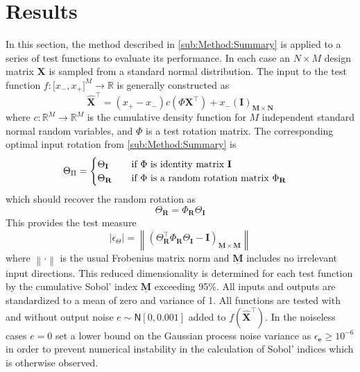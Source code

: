\documentclass[preprint,12pt]{elsarticle}
\newcommand*{\M}[1]{\ensuremath{#1}\xspace}
\newcommand*{\vr}[1]{\M{\mathbf{#1}}}
\newcommand*{\st}[1]{\M{\mathbb{#1}}}
\newcommand{\T}[1]{\text{#1}}
\newcommand*{\QT}[2][]{\M{\quad\T{#2}\ifthenelse{\equal{#1}{}}{\quad}{#1}}}
\newcommand*{\gauss}[2]{\mathsf{N}\!\left\lbrack{} #1 , #2 \right\rbrack}
\newcommand*{\modulus}[1]{\M{\left\lvert#1\right\rvert}}
\newcommand*{\norm}[1]{\M{\left\lVert#1\right\rVert}}
\begin{document}
    \section{Results} \label{sec:Results}
        In this section, the method described in \cref{sub:Method:Summary} is applied to a series of test functions to evaluate its performance. In each case an \M{N \times M} design matrix \vr{X} is sampled from a standard normal distribution. The input to the test function \M{f\colon \lbrack x_-, x_+ \rbrack^{M} \to \st{R}} is generally constructed as
        \begin{equation} \label{def:Xhat}
            \vr{\hat{X}}^{\intercal} = (x_+ - x_-) c(\Phi \vr{X}^{\intercal}) + x_-(\vr{I})_{\vr{M} \times \vr{N}}
        \end{equation}
        where \M{c\colon \st{R}^M\to\st{R}^M} is the cumulative density function for \M{M} independent standard normal random variables, and \M{\Phi} is a test rotation matrix. 
        The corresponding optimal input rotation from \cref{sub:Method:Summary} is
        \begin{equation}
            \Theta_{\Pi} = \begin{cases}
                \Theta_{\vr{I}} & \QT{if \M{\Phi} is identity matrix \M{\vr{I}}} \\
                \Theta_{\vr{R}} & \QT{if \M{\Phi} is a random rotation matrix \M{\Phi_{\vr{R}}}}
            \end{cases}
        \end{equation}
        which should recover the random rotation as
        \begin{equation}
            \Theta_{\vr{R}} = \Phi_{\vr{R}} \Theta_{\vr{I}}
        \end{equation}
        This provides the test measure
        \begin{equation}
            \modulus{\epsilon_{\Theta}} = \norm{\left(\Theta_{\vr{R}}^{\intercal} \Phi_{\vr{R}} \Theta_{\vr{I}} - \vr{I}\right)_{\underline{\vr{M}}\times\underline{\vr{M}}}}
        \end{equation}
        where \M{\norm{\cdot}} is the usual Frobenius matrix norm and \M{\underline{\vr{M}}} includes no irrelevant input directions. 
        This reduced dimensionality is determined for each test function by the cumulative Sobol' index \M{\underline{\vr{M}}} exceeding 95\%.
        All inputs and outputs are standardized to a mean of zero and variance of 1. All functions are tested with and without output noise \M{e \sim \gauss{0}{0.001}} added to \M{f(\vr{\hat{X}}^{\intercal})}. 
        In the noiseless cases \M{e=0} set a lower bound on the Gaussian process noise variance as \M{\epsilon_\vr{e} \geq 10^{-6}} in order to prevent numerical instability in the calculation of Sobol' indices which is otherwise observed. 
\end{document}
